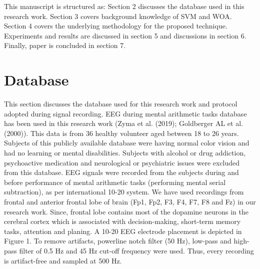 This manuscript is structured as: Section 2 discusses the database used in this research work. Section 3 covers background knowledge of SVM and WOA. Section 4 covers the underlying methodology for the proposed technique. Experiments and results are discussed in section 5 and discussions in section 6. Finally, paper is concluded in section 7.

\section{Database}

This section discusses the database used for this research work and protocol adopted during signal recording. EEG during mental arithmetic tasks database has been used in this research work (Zyma et al. (2019); Goldberger AL et al. (2000)). This data is from 36 healthy volunteer aged between 18 to 26 years. Subjects of this publicly available database were having normal color vision and had no learning or mental disabilities. Subjects with alcohol or drug addiction, psychoactive medication and neurological or psychiatric issues were excluded from this database. EEG signals were recorded from the subjects during and before performance of mental arithmetic tasks (performing mental serial subtraction), as per international 10-20 system. We have used recordings from frontal and anterior frontal lobe of brain (Fp1, Fp2, F3, F4, F7, F8 and Fz) in our research work. Since, frontal lobe contains most of the dopamine neurons in the cerebral cortex which is associated with decision-making, short-term memory tasks, attention and planing. A 10-20 EEG electrode placement is depicted in Figure 1. To remove artifacts, powerline notch filter (50 Hz), low-pass and high-pass filter of 0.5 $\mathrm{Hz}$ and 45 Hz cut-off frequency were used. Thus, every recording is artifact-free and sampled at 500 Hz.

